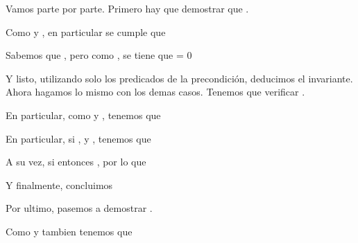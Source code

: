 \documentclass{article}
\begin{document}
Vamos parte por parte. Primero hay que demostrar que .

Como  y , en particular se cumple que 

Sabemos que , pero como , se tiene que  = 0

Y listo, utilizando solo los predicados de la precondición, deducimos el invariante. Ahora hagamos lo mismo con los demas casos. Tenemos que verificar .




En particular, como  y , tenemos que 




En particular, si , y , tenemos que 

A su vez, si  entonces , por lo que 

Y finalmente, concluimos 

Por ultimo, pasemos a demostrar .


Como  y tambien  tenemos que 
\end{document}
